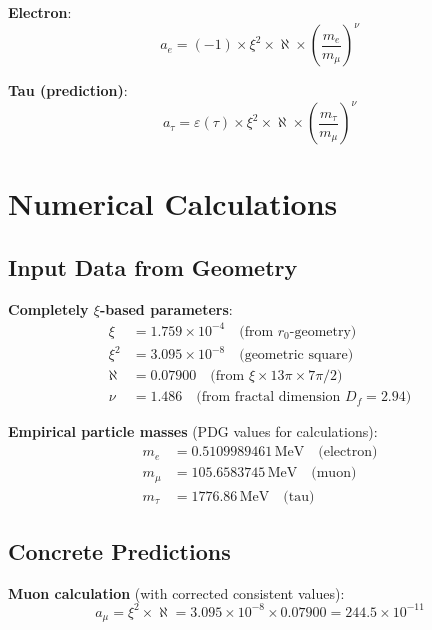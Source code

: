 \documentclass[12pt,a4paper]{article}
\newcommand{\xipar}{\xi}
\newcommand{\rzero}{r_0}
\newcommand{\nulep}{\nu}
\newcommand{\epsilonlep}{\varepsilon}
\begin{document}
	\textbf{Electron}:
	\begin{equation}
		a_e = (-1) \times \xipar^2 \times \aleph \times \left(\frac{m_e}{m_\mu}\right)^\nulep
	\end{equation}
	
	\textbf{Tau (prediction)}:
	\begin{equation}
		a_\tau = \epsilonlep(\tau) \times \xipar^2 \times \aleph \times \left(\frac{m_\tau}{m_\mu}\right)^\nulep
	\end{equation}
	
	\section{Numerical Calculations}
	
	\subsection{Input Data from Geometry}
	
	\textbf{Completely $\xipar$-based parameters}:
	\begin{align}
		\xipar &= 1.759 \times 10^{-4} \quad \text{(from $\rzero$-geometry)} \\
		\xipar^2 &= 3.095 \times 10^{-8} \quad \text{(geometric square)} \\
		\aleph &= 0.07900 \quad \text{(from $\xipar \times 13\pi \times 7\pi/2$)} \\
		\nulep &= 1.486 \quad \text{(from fractal dimension $D_f = 2.94$)}
	\end{align}
	
	\textbf{Empirical particle masses} (PDG values for calculations):
	\begin{align}
		m_e &= 0.5109989461\,\text{MeV} \quad \text{(electron)} \\
		m_\mu &= 105.6583745\,\text{MeV} \quad \text{(muon)} \\
		m_\tau &= 1776.86\,\text{MeV} \quad \text{(tau)}
	\end{align}
	
	\subsection{Concrete Predictions}
	
	\textbf{Muon calculation} (with corrected consistent values):
	\begin{equation}
		a_\mu = \xipar^2 \times \aleph = 3.095 \times 10^{-8} \times 0.07900 = 244.5 \times 10^{-11}
	\end{equation}
	
\end{document}

